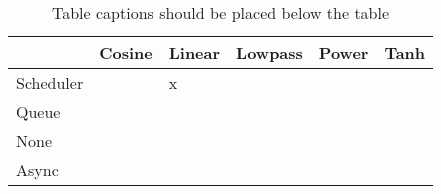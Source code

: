 \documentclass{article}
\begin{document}
\begin{table}
\begin{center}
\begin{tabular}{|l|l|l|l|l|l|}
\hline
          & Cosine & Linear & Lowpass & Power & Tanh \\
\hline
Scheduler &        &   x    &         &       & \\
\hline
Queue	  &        &        &         &       & \\
\hline
None	  &        &        &         &       & \\
\hline
Async	  &        &        &         &       & \\
\hline
\end{tabular}
\end{center}
\caption{Table captions should be placed below the table}
\label{tab:example}
\end{table}




%
%
%

%

%
\end{document}
